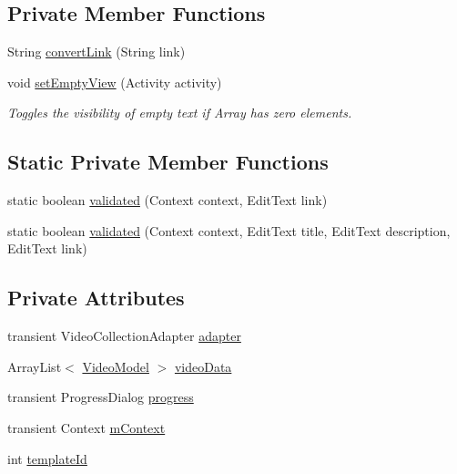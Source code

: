 \subsection*{Private Member Functions}
\begin{DoxyCompactItemize}
\item 
String \hyperlink{classorg_1_1buildmlearn_1_1toolkit_1_1templates_1_1VideoCollectionTemplate_a30b5bc7cb3b02171293c7c361eb3edd8}{convert\+Link} (String link)
\item 
void \hyperlink{classorg_1_1buildmlearn_1_1toolkit_1_1templates_1_1VideoCollectionTemplate_a38c9adf28e8cd8d78b05fba7abb707fc}{set\+Empty\+View} (Activity activity)
\begin{DoxyCompactList}\small\item\em Toggles the visibility of empty text if Array has zero elements. \end{DoxyCompactList}\end{DoxyCompactItemize}
\subsection*{Static Private Member Functions}
\begin{DoxyCompactItemize}
\item 
static boolean \hyperlink{classorg_1_1buildmlearn_1_1toolkit_1_1templates_1_1VideoCollectionTemplate_ab816b378182db4eb68aef3a0144b4096}{validated} (Context context, Edit\+Text link)
\item 
static boolean \hyperlink{classorg_1_1buildmlearn_1_1toolkit_1_1templates_1_1VideoCollectionTemplate_adcbb3e09e3e0b447adfb743203094f68}{validated} (Context context, Edit\+Text title, Edit\+Text description, Edit\+Text link)
\end{DoxyCompactItemize}
\subsection*{Private Attributes}
\begin{DoxyCompactItemize}
\item 
transient Video\+Collection\+Adapter \hyperlink{classorg_1_1buildmlearn_1_1toolkit_1_1templates_1_1VideoCollectionTemplate_a9882ccea7bd58d6e79f87837898d4479}{adapter}
\item 
Array\+List$<$ \hyperlink{classorg_1_1buildmlearn_1_1toolkit_1_1templates_1_1VideoModel}{Video\+Model} $>$ \hyperlink{classorg_1_1buildmlearn_1_1toolkit_1_1templates_1_1VideoCollectionTemplate_ab1a0e508ab9ba9ce308c3fcbbc3038d4}{video\+Data}
\item 
transient Progress\+Dialog \hyperlink{classorg_1_1buildmlearn_1_1toolkit_1_1templates_1_1VideoCollectionTemplate_aa1621129731829ef6c743d68c3e361d2}{progress}
\item 
transient Context \hyperlink{classorg_1_1buildmlearn_1_1toolkit_1_1templates_1_1VideoCollectionTemplate_ad33279990de8a8fbf82aaf1300dc78c4}{m\+Context}
\item 
int \hyperlink{classorg_1_1buildmlearn_1_1toolkit_1_1templates_1_1VideoCollectionTemplate_ac6e1ea89fd6a5a50f5a081fca1cf1531}{template\+Id}
\end{DoxyCompactItemize}
